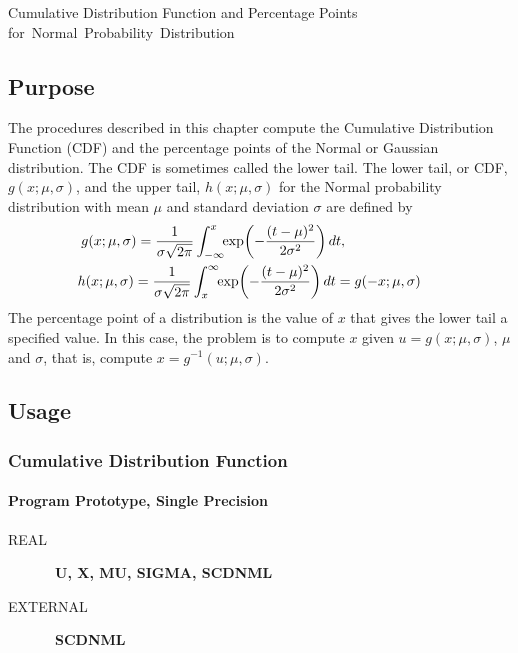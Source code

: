 \documentclass[twoside]{MATH77}
\begin{document}
 Cumulative Distribution Function and Percentage Points
\hbox{for Normal Probability Distribution}


\subsection{Purpose}

The procedures described in this chapter compute the Cumulative Distribution
Function (CDF) and the percentage points of the Normal or Gaussian
distribution. The CDF is sometimes called the lower tail. The lower tail,
or CDF, $g(x;\mu ,\sigma )$, and the upper
tail, $h(x;\mu ,\sigma )$ for the Normal probability distribution with mean $%
\mu $ and standard deviation $\sigma $ are defined by%
\begin{gather*}
\hspace{-15pt}g(x;\mu ,\sigma )=\frac 1{\sigma \sqrt{2\pi }}\int_{-\infty }^x\!\!\exp
\!\left( -\frac{(t-\mu )^2}{2\sigma ^2}\right) dt,\rule{50pt}{0pt}\\
\hspace{-15pt}h(x;\mu ,\sigma )=\frac 1{\sigma \sqrt{2\pi }}\int_x^\infty \!\!\exp
\!\left( -\frac{(t-\mu )^2}{2\sigma ^2}\right) dt=g(-x;\mu ,\sigma )
\end{gather*}
The percentage point of a distribution is the value of $x$ that gives the
lower tail a specified value. In this case, the problem is to compute $x$
given $u = g(x;\mu ,\sigma )$, $\mu $ and $\sigma $, that is, compute $x =
g^{-1}(u;\mu ,\sigma ).$

\subsection{Usage}

\subsubsection{Cumulative Distribution Function}
\paragraph{Program Prototype, Single Precision}

\begin{description}
\item[REAL]  \ {\bf U, X, MU, SIGMA, SCDNML}

\item[EXTERNAL]  \ {\bf SCDNML}
\end{description}
\end{document}
